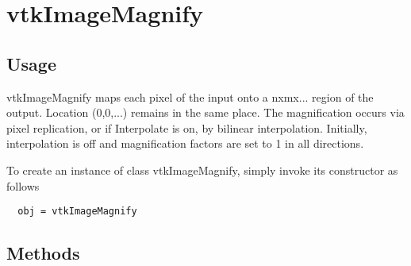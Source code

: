 \section{vtkImageMagnify}

\subsection{Usage}

 vtkImageMagnify maps each pixel of the input onto a nxmx... region
 of the output.  Location (0,0,...) remains in the same place. The
 magnification occurs via pixel replication, or if Interpolate is on,
 by bilinear interpolation. Initially, interpolation is off and magnification
 factors are set to 1 in all directions.

To create an instance of class vtkImageMagnify, simply
invoke its constructor as follows
\begin{verbatim}
  obj = vtkImageMagnify
\end{verbatim}
\subsection{Methods}

